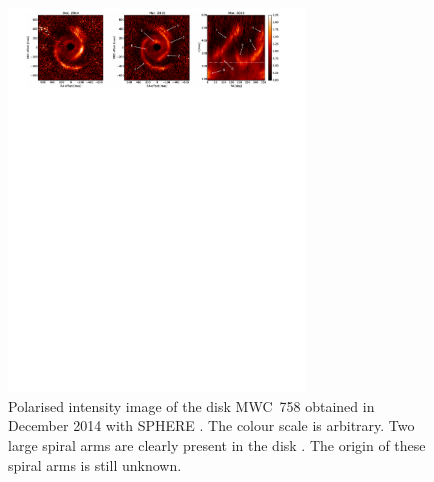 \begin{figure}
    \centering
    \includegraphics[width = 0.7\textwidth]{figures/mwc758.pdf}
    \caption{Polarised intensity image of the disk MWC~758 obtained in December 2014 with SPHERE \citep[eg.][]{beuzit2019}. The colour scale is arbitrary. Two large spiral arms are clearly present in the disk \citep{benisty2015}. The origin of these spiral arms is still unknown.}
    \label{fig:mwc758}
\end{figure}

